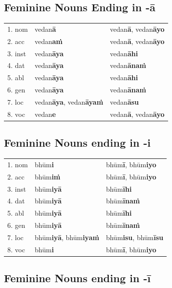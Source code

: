 \documentclass[11pt,oneside]{memoir}
\begin{document}
\clearpage
\subsection{Feminine Nouns Ending in -ā}
\label{sec:org0df281d}

\begin{center}
\begin{tabular}{lll}
1. nom & vedan\textbf{ā} & vedan\textbf{ā}, vedan\textbf{āyo}\\
2. acc & vedan\textbf{aṁ} & vedan\textbf{ā}, vedan\textbf{āyo}\\
3. inst & vedan\textbf{āya} & vedan\textbf{āhi}\\
4. dat & vedan\textbf{āya} & vedan\textbf{ānaṁ}\\
5. abl & vedan\textbf{āya} & vedan\textbf{āhi}\\
6. gen & vedan\textbf{āya} & vedan\textbf{ānaṁ}\\
7. loc & vedan\textbf{āya}, vedan\textbf{āyaṁ} & vedan\textbf{āsu}\\
8. voc & vedan\textbf{e} & vedan\textbf{ā}, vedan\textbf{āyo}\\
\end{tabular}
\end{center}
\subsection{Feminine Nouns ending in -i}
\label{sec:orgc01b67e}

\begin{center}
\begin{tabular}{lll}
1. nom & bhūm\textbf{i} & bhūm\textbf{ī}, bhūm\textbf{iyo}\\
2. acc & bhūm\textbf{iṁ} & bhūm\textbf{ī}, bhūm\textbf{iyo}\\
3. inst & bhūm\textbf{iyā} & bhūm\textbf{īhi}\\
4. dat & bhūm\textbf{iyā} & bhūm\textbf{īnaṁ}\\
5. abl & bhūm\textbf{iyā} & bhūm\textbf{īhi}\\
6. gen & bhūm\textbf{iyā} & bhūm\textbf{īnaṁ}\\
7. loc & bhūm\textbf{iyā}, bhūm\textbf{iyaṁ} & bhūm\textbf{isu}, bhūm\textbf{īsu}\\
8. voc & bhūm\textbf{i} & bhūm\textbf{ī}, bhūm\textbf{iyo}\\
\end{tabular}
\end{center}
\subsection{Feminine Nouns ending in -ī}
\label{sec:org91dd242}
\end{document}
